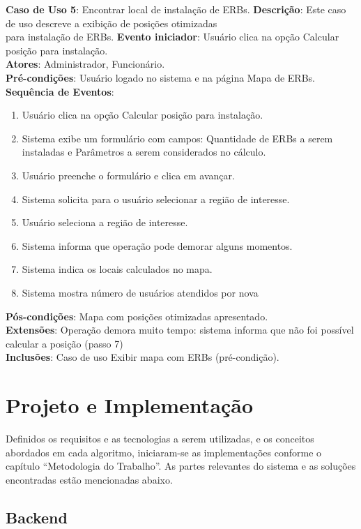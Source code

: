 \documentclass[]{politex}
\begin{document}
\noindent \textbf{Caso de Uso 5}: Encontrar local de instalação de ERBs.
\textbf{Descrição}: Este caso de uso descreve a exibição de posições otimizadas \\
para instalação de ERBs.
\textbf{Evento iniciador}: Usuário clica na opção Calcular posição para instalação. \\
\textbf{Atores}: Administrador, Funcionário. \\
\textbf{Pré-condições}: Usuário logado no sistema e na página Mapa de ERBs. \\
\textbf{Sequência de Eventos}:
\begin{enumerate}
\item Usuário clica na opção Calcular posição para instalação.
\item Sistema exibe um formulário com campos: Quantidade de ERBs a serem
instaladas e Parâmetros a serem considerados no cálculo.
\item Usuário preenche o formulário e clica em avançar.
\item Sistema solicita para o usuário selecionar a região de interesse.
\item Usuário seleciona a região de interesse.
\item Sistema informa que operação pode demorar alguns momentos.
\item Sistema indica os locais calculados no mapa.
\item Sistema mostra número de usuários atendidos por nova
\end{enumerate}
\textbf{Pós-condições}: Mapa com posições otimizadas apresentado. \\
\textbf{Extensões}: Operação demora muito tempo: sistema informa que não foi
possível calcular a posição (passo 7) \\
\textbf{Inclusões}: Caso de uso Exibir mapa com ERBs (pré-condição). \\

\chapter{Projeto e Implementação}

Definidos os requisitos e as tecnologias a serem utilizadas, e os conceitos
abordados em cada algoritmo, iniciaram-se as implementações conforme o capítulo
``Metodologia do Trabalho''. As partes relevantes do sistema e as soluções
encontradas estão mencionadas abaixo.

\section{Backend}
\end{document}
